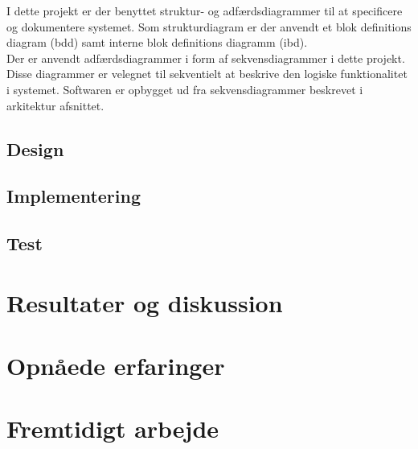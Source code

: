 I dette projekt er der benyttet struktur- og adfærdsdiagrammer til at specificere og 
dokumentere systemet. Som strukturdiagram er der anvendt et blok definitions diagram (bdd) samt interne blok definitions diagramm (ibd).\\
Der er anvendt adfærdsdiagrammer i form af sekvensdiagrammer i dette projekt. Disse 
diagrammer er velegnet til sekventielt at beskrive den logiske funktionalitet i systemet.
Softwaren er opbygget ud fra sekvensdiagrammer beskrevet i arkitektur afsnittet. 



\subsection{Design}


\subsection{Implementering}


\subsection{Test}


\section{Resultater og diskussion}


\section{Opnåede erfaringer}


\section{Fremtidigt arbejde}
